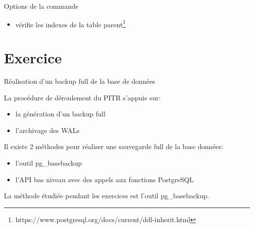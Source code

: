 
\begin{frame}{Options de la commande }

\begin{itemize}
   \item {} vérifie les indexes de la table parent\footnote{https://www.postgresql.org/docs/current/ddl-inherit.html}
\end{itemize}

\end{frame}


\section{Exercice}


\begin{frame}{Réalisation d'un backup full de la base de données}

La procédure de déroulement du PITR s'appuie sur:
\begin{itemize}
   \item la génération d'un backup full
   \item l'archivage des WALs
\end{itemize}


Il existe 2 méthodes pour réaliser une sauvegarde full de la base données:
\begin{itemize}
   \item l'outil \textsf{pg\_basebackup}
   \item l'API bas niveau avec des appels aux fonctions PostgreSQL
\end{itemize}

La méthode étudiée pendant les exercices est l'outil \textsf{pg\_basebackup}.

\end{frame}


